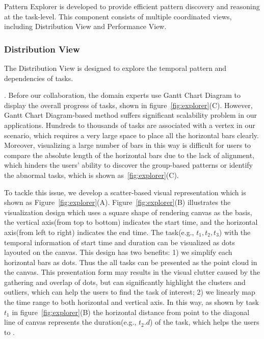Pattern Explorer is developed to provide efficient pattern discovery and reasoning at the task-level. This component consists of multiple coordinated views, including Distribution View and Performance View.
\subsubsection{Distribution View}
The Distribution View is designed to explore the temporal pattern and dependencies of tasks.

.
Before our collaboration, the domain experts use Gantt Chart Diagram to display the overall progress of tasks, shown in figure~\ref{fig:explorer}(C). 
However, Gantt Chart Diagram-based method suffers significant scalability problem in our applications. Hundreds to thousands of tasks are associated with a vertex in our scenario, which requires a very large space to place all the horizontal bars clearly. 
Moreover, visualizing a large number of bars in this way is difficult for users to compare the absolute length of the horizontal bars due to the lack of alignment, which hinders the users' ability to discover the group-based patterns or identify the abnormal tasks, which is shown as~\ref{fig:explorer}(C).

To tackle this issue, we develop a scatter-based visual representation which is shown as Figure~\ref{fig:explorer}(A). Figure~\ref{fig:explorer}(B) illustrates the visualization design which uses a square shape of rendering canvas as the basis, the vertical axis(from top to bottom) indicates the start time, and the horizontal axis(from left to right) indicates the end time.
The task(e.g., $t_1, t_2, t_3$) with the temporal information of start time and duration can be visualized as dots layouted on the canvas. 
This design has two benefits: 1) we simplify each horizontal bars as dots. Thus the all tasks can be presented as the point cloud in the canvas. This presentation form may results in the visual clutter caused by the gathering and overlap of dots, but can significantly highlight the clusters and outliers, which can help the users to find the task of interest; 2) we linearly map the time range to both horizontal and vertical axis. In this way, as shown by task $t_1$ in figure~\ref{fig:explorer}(B) the horizontal distance from point to the diagonal line of canvas represents the duration(e.g., $t_2.d$) of the task, which helps the users to . 



